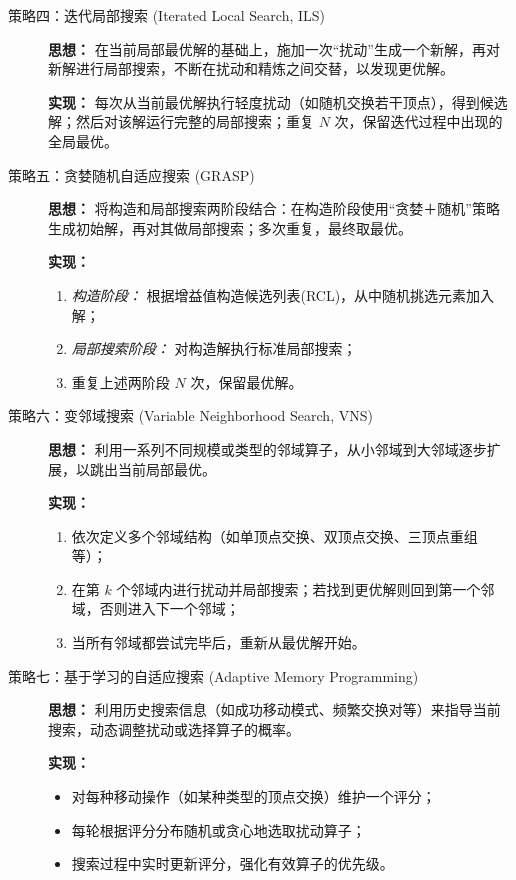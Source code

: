 \documentclass{article}
\begin{document}
\begin{description}
  \item[策略四：迭代局部搜索 (Iterated Local Search, ILS)]
  
  \textbf{思想：} 在当前局部最优解的基础上，施加一次“扰动”生成一个新解，再对新解进行局部搜索，不断在扰动和精炼之间交替，以发现更优解。  
  
  \textbf{实现：} 每次从当前最优解执行轻度扰动（如随机交换若干顶点），得到候选解；然后对该解运行完整的局部搜索；重复 \(N\) 次，保留迭代过程中出现的全局最优。

  \item[策略五：贪婪随机自适应搜索 (GRASP)]
  
  \textbf{思想：} 将构造和局部搜索两阶段结合：在构造阶段使用“贪婪＋随机”策略生成初始解，再对其做局部搜索；多次重复，最终取最优。  
  
  \textbf{实现：}  
  \begin{enumerate}
    \item \emph{构造阶段：} 根据增益值构造候选列表(RCL)，从中随机挑选元素加入解；  
    \item \emph{局部搜索阶段：} 对构造解执行标准局部搜索；  
    \item 重复上述两阶段 \(N\) 次，保留最优解。
  \end{enumerate}

  \item[策略六：变邻域搜索 (Variable Neighborhood Search, VNS)]
  
  \textbf{思想：} 利用一系列不同规模或类型的邻域算子，从小邻域到大邻域逐步扩展，以跳出当前局部最优。  
  
  \textbf{实现：}  
  \begin{enumerate}
    \item 依次定义多个邻域结构（如单顶点交换、双顶点交换、三顶点重组等）；  
    \item 在第 \(k\) 个邻域内进行扰动并局部搜索；若找到更优解则回到第一个邻域，否则进入下一个邻域；  
    \item 当所有邻域都尝试完毕后，重新从最优解开始。
  \end{enumerate}

  \item[策略七：基于学习的自适应搜索 (Adaptive Memory Programming)]
  
  \textbf{思想：} 利用历史搜索信息（如成功移动模式、频繁交换对等）来指导当前搜索，动态调整扰动或选择算子的概率。  
  
  \textbf{实现：}  
  \begin{itemize}
    \item 对每种移动操作（如某种类型的顶点交换）维护一个评分；  
    \item 每轮根据评分分布随机或贪心地选取扰动算子；  
    \item 搜索过程中实时更新评分，强化有效算子的优先级。
  \end{itemize}
\end{description}
\end{document}
